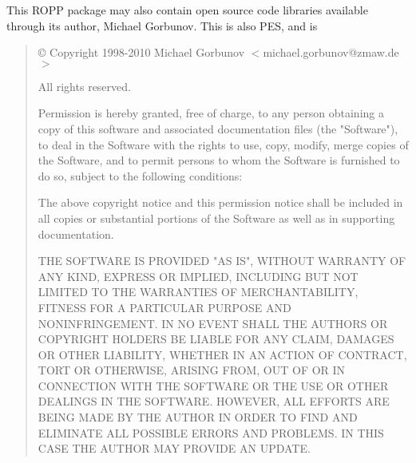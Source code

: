 This ROPP package may also contain open source code libraries available
through its author, Michael Gorbunov. This is also PES, and is
%
\begin{quote}
   \copyright{} Copyright 1998-2010 Michael Gorbunov $<$michael.gorbunov@zmaw.de$>$

    All rights reserved.

    Permission is hereby granted, free of charge, to any person obtaining
    a copy of this software and associated documentation files (the
    "Software"), to deal in the Software with the rights to use, copy, modify,
    merge copies of the Software, and to permit persons to whom the Software
    is furnished to do so, subject to the following conditions:

    The above copyright notice and this permission notice shall be
    included in all copies or substantial portions of the Software as well
    as in supporting documentation.

    THE SOFTWARE IS PROVIDED "AS IS", WITHOUT WARRANTY OF ANY KIND,
    EXPRESS OR IMPLIED, INCLUDING BUT NOT LIMITED TO THE WARRANTIES OF
    MERCHANTABILITY, FITNESS FOR A PARTICULAR PURPOSE AND
    NONINFRINGEMENT. IN NO EVENT SHALL THE AUTHORS OR COPYRIGHT
    HOLDERS BE LIABLE FOR ANY CLAIM, DAMAGES OR OTHER LIABILITY,
    WHETHER IN AN ACTION OF CONTRACT, TORT OR OTHERWISE, ARISING
    FROM, OUT OF OR IN CONNECTION WITH THE SOFTWARE OR THE USE OR
    OTHER DEALINGS IN THE SOFTWARE. HOWEVER, ALL EFFORTS ARE BEING
    MADE BY THE AUTHOR IN ORDER TO FIND AND ELIMINATE ALL POSSIBLE
    ERRORS AND PROBLEMS. IN THIS CASE THE AUTHOR MAY PROVIDE AN UPDATE.
\end{quote}
%

